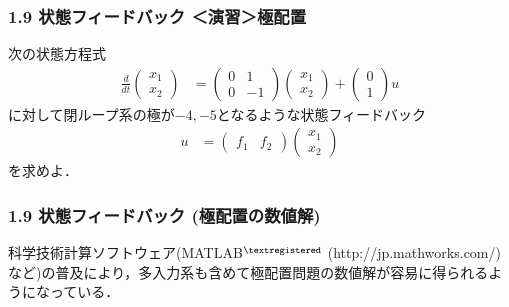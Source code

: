 \begin{frame}[t]
\frametitle{1.9 状態フィードバック ＜演習＞極配置}
次の状態方程式
\begin{align*}
  \frac{d}{dt}
  \left (
  \begin{array}{c}
   x_1 \\ x_2
  \end{array}
  \right )
  & =
  \left (
  \begin{array}{cc}
   0 & 1 \\
   0 & -1
  \end{array}
  \right )
  \left (
  \begin{array}{c}
   x_1 \\ x_2
  \end{array}
  \right )
  +
  \left (
  \begin{array}{c}
   0 \\ 1
  \end{array}
  \right )
  u
\end{align*}
に対して閉ループ系の極が$-4,-5$となるような状態フィードバック
\begin{align*}
  u
  &=
  \left (
  \begin{array}{cc}
   f_1 & f_2
  \end{array}
  \right )
  \left (
  \begin{array}{c}
   x_1 \\ x_2
  \end{array}
  \right )
\end{align*}
を求めよ．
\end{frame}

\begin{frame}[t]
\frametitle{1.9 状態フィードバック (極配置の数値解)}
\vspace*{30mm}

科学技術計算ソフトウェア(MATLAB$^{\tiny \textregistered}$ (http://jp.mathworks.com/)など)の普及により，多入力系も含めて極配置問題の数値解が容易に得られるようになっている．

\end{frame}


